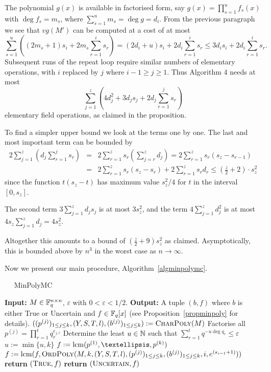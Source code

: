 The polynomial $g(x)$ is available in factorised form,
say $g(x)=\prod_{s=1}^uf_s(x)$ with $\deg f_s=m_s$,
where $\sum_{s=1}^um_s=\deg g=d_i$. From the previous
paragraph we see that $vg(M')$ can be computed at a cost of at most
\[
\sum_{s=1}^u\left((2m_s+1)s_i +2m_s\sum_{r=1}^i s_r \right)
=(2d_i+u)s_i+2d_i\sum_{r=1}^is_r \leq 3d_is_i+2d_i\sum_{r=1}^is_r.
\]
Subsequent runs of the repeat loop require similar numbers of elementary
operations, with $i$ replaced by $j$ where $i-1\geq j\geq 1$.
Thus Algorithm 4 needs at most
\[
\sum_{j=1}^z \left( 4d_j^2  + 3d_j s_j + 2d_j 
\sum_{r=1}^j s_r \right)
\]
elementary field operations, as claimed in the proposition.

To find a simpler upper bound we look at the terms one by one. The
last and most important term can be bounded by
\begin{eqnarray*}
  2\sum_{j=1}^z \left( d_j \sum_{r=1}^j s_r \right)
    &=& 2 \sum_{r=1}^z s_r \left(\sum_{j=r}^z d_j\right)
    = 2 \sum_{r=1}^z s_r (s_z - s_{r-1}) \\
    &=& 2 \sum_{r=1}^z s_r (s_z - s_r) + 2 \sum_{r=1}^z s_r d_r
    \le (\frac{z}{2}+2) \cdot s_z^2
\end{eqnarray*}
since the function $t(s_z-t)$ has maximum value $s_z^2/4$
for $t$ in the interval $[0,s_z]$.

The second term $3\sum_{j=1}^z d_j s_j$ is at most $3s_z^2$,
and the term
$4 \sum_{j=1}^z d_j^2$ is at most $4s_z\sum_{j=1}^z d_j = 4s_z^2$.

Altogether this amounts to a bound of $(\frac{z}{2}+9)s_z^2$ as claimed.
Asymptotically, this is bounded above by $n^3$ in the worst case as
$n \to \infty$.
\proofend

\smallskip
Now we present our main procedure, Algorithm~\ref{algminpolymc}. 

\begin{algorithm}
\caption{$\quad$ \sc MinPolyMC}
\label{algminpolymc}
%
\begin{algorithmic}
\STATE \textbf{Input:} $M \in \mathbb{F}_q^{n \times n}$, $\varepsilon$ with
$0 < \varepsilon < 1/2$.
\STATE \textbf{Output:} A tuple $(b,f)$ where $b$ is either {\sc True}
or {\sc Uncertain} and $f \in \mathbb{F}_q[x]$
\STATE \hspace*{0mm}  (see
Proposition~\ref{propminpoly} for details).
\vspace*{2mm}
\STATE
       $((p^{(j)})_{1 \le j \le k},(Y,S,T,l),(b^{(j)})_{1 \le j \le k})
       := \mbox{\sc CharPoly}(M)$
\STATE Factorise all $p^{(j)} = \prod_{r=1}^t q_r^{e_{j,r}}$ 
\STATE Determine the least $u \in \mathbb{N}$ such that
 $\sum_{r=1}^t q^{-u\deg q_r} \le \varepsilon$
\STATE $u := \min\{ u,k \}$
\STATE $f := \lcm(p^{(1)}, \ldots, p^{(k)})$ 
    \STATE $f := \mathrm{lcm}(f,\mbox{\sc OrdPoly}
           (M,k,(Y,S,T,l),(p^{(j)})_{1 \le j \le k}, 
           (b^{(j)})_{1 \le j \le k},i,e^{(s_{i-1}+1)}))$
\ENDFOR
{}
    \STATE \textbf{return} $(\mbox{\sc True},f)$
\ELSE
    \STATE \textbf{return} $(\mbox{\sc Uncertain},f)$
\ENDIF
\end{algorithmic}
\end{algorithm}

